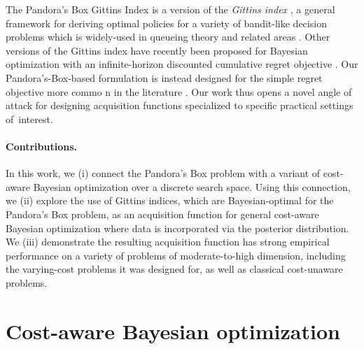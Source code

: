 \documentclass{article}
\begin{document}
The Pandora's Box Gittins Index is a version of the \emph{Gittins index} \cite{gittins2011multiarmed}, a general framework for deriving optimal policies for a variety of bandit-like decision problems \cite{weber_gittins_1992, dumitriu_playing_2003, gupta_markovian_2019} which is widely-used in queueing theory and related areas \cite{glazebrook_parallel_2001, aalto_gittins_2009, scully_gittins_2020}.
Other versions of the Gittins index have recently been proposed for Bayesian optimization with an infinite-horizon discounted cumulative regret objective \cite{persky_exploration_2021}.
Our Pandora's-Box-based formulation is instead designed for the simple regret objective more commo n in the literature \cite{garnett23}.
Our work thus opens a novel angle of attack for designing acquisition functions specialized to specific practical settings of~interest.

\paragraph*{Contributions.}
In this work, we (i) connect the Pandora's Box problem with a variant of cost-aware Bayesian optimization over a discrete search space.
Using this connection, we (ii) explore the use of Gittins indices, which are Bayesian-optimal for the Pandora's Box problem, as an acquisition function for general cost-aware Bayesian optimization where data is incorporated via the posterior distribution. 
We (iii) demonstrate the resulting acquisition function has strong empirical performance on a variety of problems of moderate-to-high dimension, including the varying-cost problems it was designed for, as well as classical cost-unaware problems.








\section{Cost-aware Bayesian optimization}
\label{sec:background}
\end{document}
